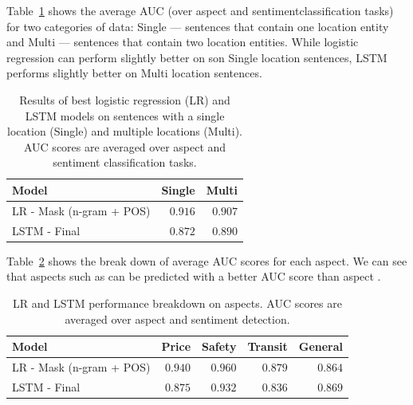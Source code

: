 \documentclass[11pt]{article}
\begin{document}
    Table~\ref{tab:results_categories} shows the average AUC (over aspect and sentimentclassification tasks) for two categories of data: Single --- sentences that contain one location entity and Multi --- sentences that contain two location entities. While logistic regression can perform slightly better on son Single location sentences, LSTM performs slightly better on Multi location sentences. 
    \begin{table}[ht]
        \centering
        \begin{tabular}{l| r | r}
            Model                       &           Single      &           Multi               \\
            \hline
            LR - Mask (n-gram + POS)           &   $\mathbf{0.916}$    &           $\mathbf{0.907}$    \\
            \hline      
            LSTM - Final                &       $0.872$         &           $0.890$             \\
        \end{tabular}
        \caption{Results of best logistic regression (LR) and LSTM models on sentences with a single location (Single) and multiple locations (Multi). AUC scores are averaged over aspect and sentiment classification tasks.}
        \label{tab:results_categories}
    \end{table}
    
    Table~\ref{tab:results_aspects} shows the break down of average AUC scores for each aspect. We can see that aspects such as  can be predicted with a better AUC score than aspect .  
    \begin{table}[ht]
        \centering
        \begin{tabular}{l| r | r | r | r }
            Model               &       Price           &   Safety              &   Transit             &           General         \\
            \hline
            LR - Mask (n-gram + POS)   &   $\mathbf{0.940}$    &   $\mathbf{0.960}$    &   $\mathbf{0.879}$    &           $0.864$         \\
            \hline
            LSTM - Final        &       $0.875$         &       $0.932$         &       $0.836$         &       $\mathbf{0.869}$     \\
        \end{tabular}
        \caption{LR and LSTM performance breakdown on aspects. AUC scores are averaged over aspect and sentiment detection.}
        \label{tab:results_aspects}
    \end{table}
    
\end{document}
